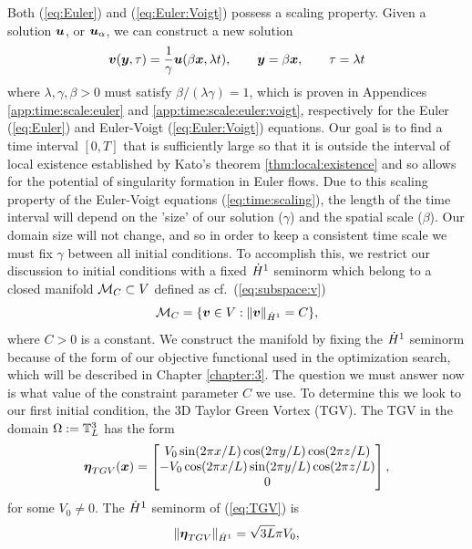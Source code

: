 Both (\ref{eq:Euler}) and (\ref{eq:Euler:Voigt}) possess a scaling property. Given a solution $\boldsymbol u$, or $\boldsymbol u_{\alpha}$, we can construct a new solution
\begin{equation}\label{eq:time:scaling}
\boldsymbol v(\boldsymbol y,\tau) = \frac{1}{\gamma}\boldsymbol u(\beta\boldsymbol x,\lambda t), \qquad \boldsymbol y = \beta \boldsymbol x, \qquad \tau = \lambda t
\end{equation}
where $\lambda,\gamma,\beta >0$ must satisfy $\beta/(\lambda\gamma) = 1$, which is proven in Appendices \ref{app:time:scale:euler} and \ref{app:time:scale:euler:voigt}, respectively for the Euler (\ref{eq:Euler}) and Euler-Voigt (\ref{eq:Euler:Voigt}) equations. Our goal is to find a time interval $[0,T]$ that is sufficiently large so that it is outside the interval of local existence established by Kato's theorem \ref{thm:local:existence} and so allows for the potential of singularity formation in Euler flows. Due to this scaling property of the Euler-Voigt equations (\ref{eq:time:scaling}), the length of the time interval will depend on the 'size' of our solution ($\gamma$) and the spatial scale ($\beta$). Our domain size will not change, and so in order to keep a consistent time scale we must fix $\gamma$ between all initial conditions. To accomplish this, we restrict our discussion to initial conditions with a fixed $\dot{H}^1$ seminorm which belong to a closed manifold $\mathcal{M}_C\subset V$ defined as cf.~(\ref{eq:subspace:v})
\begin{equation}\label{eq:manifold}
\mathcal{M}_C = \{\boldsymbol v \in V : \|\boldsymbol v\|_{\dot{H}^1} = C \},
\end{equation}
where $C>0$ is a constant. We construct the manifold by fixing the $\dot{H}^1$ seminorm because of the form of our objective functional used in the optimization search, which will be described in Chapter \ref{chapter:3}. The question we must answer now is what value of the constraint parameter $C$ we use. To determine this we look to our first initial condition, the 3D Taylor Green Vortex (TGV). The TGV in the domain $\Omega := \mathbb{T}^3_L$ has the form
\begin{equation}\label{eq:TGV}
{\boldsymbol \eta}_{TGV}(\boldsymbol x) = \begin{bmatrix}
V_0\sin(2\pi x/L)\cos(2\pi y/L)\cos(2\pi z/L) \\
-V_0\cos(2\pi x/L)\sin(2\pi y/L)\cos(2\pi z/L) \\
0
\end{bmatrix},
\end{equation}
for some $V_0\neq 0$.
The $\dot{H}^1$ seminorm of (\ref{eq:TGV}) is
\begin{equation}\label{eq:TGV:hdo}
\|{\boldsymbol \eta}_{TGV}\|_{\dot{H}^1} = \sqrt{3L}\pi V_0,
\end{equation}

